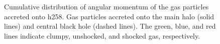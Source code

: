 \documentclass[manuscript]{aastex}
\begin{document}
\begin{figure}
\centerline{}
\caption[]{ Cumulative distribution of angular momentum of the gas particles accreted onto h258.  Gas particles accreted onto the main halo (solid lines) and central black hole (dashed lines). The green, blue, and red lines indicate clumpy, unshocked, and shocked gas, respectively.}
\label{h258angmom} 
\end{figure}
\end{document}
